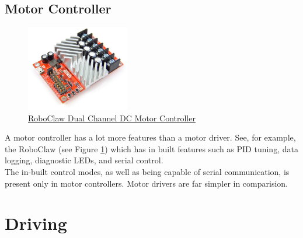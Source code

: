 \documentclass[a4paper,12pt]{article}
\begin{document}
\subsection{Motor Controller}


\begin{figure}
    \includegraphics[width=0.4\textwidth]{roboclaw.jpg}
    \caption{\href{https://www.robotshop.com/media/files/content/b/bat/pdf/roboclaw_datasheet_2x30a-2.pdf}{RoboClaw Dual Channel DC Motor Controller}}
    \label{fig:roboclaw}
\end{figure}

A motor controller has a lot more features than a motor driver. See, for example, the RoboClaw (see Figure \ref{fig:roboclaw}) which has in built features such as PID tuning, data logging, diagnostic LEDs, and serial control. \\


The in-built control modes, as well as being capable of serial communication, is present only in motor controllers. Motor drivers are far simpler in comparision. \\


\bigskip \bigskip


\section{Driving}
\end{document}
